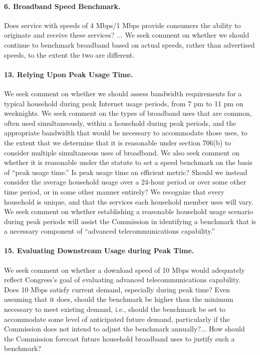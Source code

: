 \paragraph{6. Broadband Speed Benchmark.} Does service with speeds of 4 Mbps/1 Mbps 
provide consumers the ability to originate and receive these services? ... We seek 
comment on whether we should continue to benchmark broadband based on actual speeds, 
rather than advertised speeds, to the extent the two are different.

\paragraph{13. Relying Upon Peak Usage Time.}
We seek comment on whether we should assess bandwidth requirements for a typical household
during peak Internet usage periods, from 7 pm to 11 pm on weeknights.
We seek comment on the types of broadband uses that are common, often used simultaneously, 
within a household during peak periods, and the appropriate bandwidth that would be 
necessary to accommodate those uses, to the extent that we determine that it is 
reasonable under section 706(b) to consider multiple simultaneous uses of broadband. 
We also seek comment on whether it is reasonable under the statute to set a speed 
benchmark on the basis of ``peak usage time.'' Is peak usage time an efficient metric? 
Should we instead consider the average household usage over a 24-hour period or over 
some other time period, or in some other manner entirely? We recognize that every 
household is unique, and that the services each household member uses will vary. We 
seek comment on whether establishing a reasonable household usage scenario during 
peak periods will assist the Commission in identifying a benchmark that is a 
necessary component of ``advanced telecommunications capability.''

\paragraph{15. Evaluating Downstream Usage during Peak Time.}
We seek comment on whether a download speed of 10 Mbps would adequately reflect
Congress’s goal of evaluating advanced telecommunications capability. Does 10 Mbps 
satisfy current demand, especially during peak time? Even assuming that it does, 
should the benchmark be higher than the minimum necessary to meet existing demand, 
i.e., should the benchmark be set to accommodate some level of anticipated future 
demand, particularly if the Commission does not intend to adjust the benchmark 
annually?... How should the Commission forecast future household broadband uses 
to justify such a benchmark?

